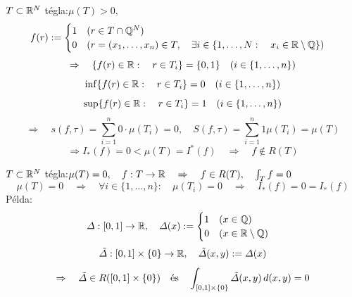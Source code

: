 \documentclass[a4paper,11.5pt]{article}
\begin{document}
	\begin{example}
		$T\subset\mathbb{R}^N$ tégla:\quad $\mu(T)>0,$
		\[ f(r):=
		\begin{cases}
			1\quad (r\in T\cap\mathbb{Q}^N)\\
			0\quad (r=(x_1,\ldots,x_n)\in T,\quad \exists i\in\{1,\ldots,N:\quad x_i\in\mathbb{R}\setminus \mathbb{Q}\})
		\end{cases}
		\]
		\[ \Rightarrow\quad \{ f(r)\in\mathbb{R}:\quad r\in T_i \}=\{0,1\}\quad (i\in\{1,\ldots,n\}) \]
		\[ \inf\{ f(r)\in\mathbb{R}:\quad r\in T_i \}=0\quad (i\in\{1,\ldots,n\}) \]
		\[ \sup\{ f(r)\in\mathbb{R}:\quad r\in T_i \}=1\quad (i\in\{1,\ldots,n\}) \]
		\[ \Rightarrow\quad s(f,\tau)=\sum_{i=1}^n0\cdot\mu(T_i)=0,\quad S(f,\tau)=\sum_{i=1}^n1\mu(T_i)=\mu(T) \]
		\[ \Rightarrow I_*(f)=0<\mu(T)=I^*(f)\quad \Rightarrow\quad f\notin R(T) \]
	\end{example}
	\begin{example}
		$T\subset\mathbb{R}^N$ tégla:\quad $\mu(T)=0,\quad f:T\to\mathbb{R} \quad \Rightarrow\quad f\in R(T),\quad \int_Tf=0$
		\[ \mu(T)=0\quad \Rightarrow\quad \forall i\in\{1,\ldots,n\}:\quad \mu(T_i)=0\quad \Rightarrow\quad I_*(f)=0=I_*(f) \]
		Példa:\[ \varDelta:[0,1]\to\mathbb{R},\quad \varDelta(x):=\begin{cases}
			1\quad (x\in\mathbb{Q})\\
			0\quad (x\in\mathbb{R}\setminus\mathbb{Q})
		\end{cases} \]
		\[ \tilde{\varDelta}:[0,1]\times\{0\}\to\mathbb{R},\quad \tilde{\varDelta}(x,y):=\varDelta(x) \]
		\[ \Rightarrow\quad \tilde{\varDelta}\in R([0,1]\times\{0\})\text{\quad és\quad }\int_{[0,1]\times\{0\}}\tilde{\varDelta}(x,y)\,d(x,y)=0 \]
	\end{example}
\end{document}
